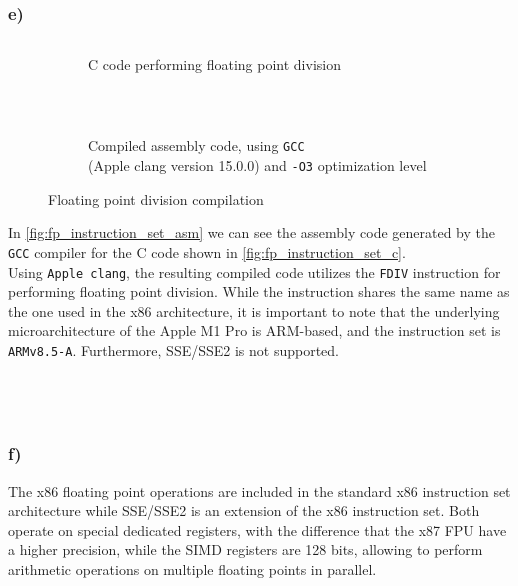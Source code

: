 \documentclass[tikz,14pt,fleqn]{article}
\begin{document}
\subsubsection*{e)}
\begin{figure}
    \vspace*{-0.5cm}
    \begin{subfigure}{1\linewidth}
        \centering
        \inputminted[fontsize=\scriptsize, bgcolor=CODEBG]{C}{../ex1/fp_instruction_set.c}
        \caption{C code performing floating point division}
        \label{fig:fp_instruction_set_c}
    \end{subfigure}\\
    \begin{subfigure}{1\linewidth}
        \centering
        \inputminted[fontsize=\scriptsize, bgcolor=CODEBG]{asm}{../ex1/fp_instruction_set.s}
        \caption{\small Compiled assembly code, using \texttt{GCC} \\(Apple clang version 15.0.0) and \texttt{-O3} optimization level}
        \label{fig:fp_instruction_set_asm}
    \end{subfigure}
    \caption{Floating point division compilation}
\end{figure}
In \autoref{fig:fp_instruction_set_asm} we can see the assembly code generated by the \texttt{GCC} compiler for the C code shown in \autoref{fig:fp_instruction_set_c}.\\
Using \texttt{Apple clang}, the resulting compiled code utilizes the \texttt{FDIV} instruction for performing floating point division. While the instruction shares the same name as the one used in the x86 architecture, it is important to note that the underlying microarchitecture of the Apple M1 Pro is ARM-based, and the instruction set is \texttt{ARMv8.5-A}. Furthermore, SSE/SSE2 is not supported.
\\\\\\\\
\subsubsection*{f)}
The x86 floating point operations are included in the standard x86 instruction set architecture while SSE/SSE2 is an extension of the x86 instruction set. Both operate on special dedicated registers, with the difference that the x87 FPU have a higher precision, while the SIMD registers are 128 bits, allowing to perform arithmetic operations on multiple floating points in parallel.
\end{document}
